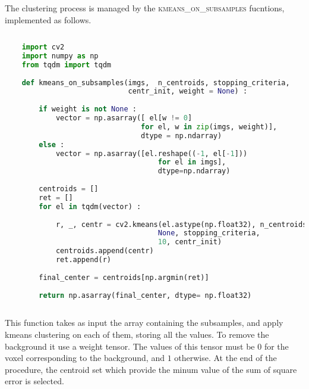 \documentclass{standalone}
\begin{document}
	The clustering process is managed by the \textsc{kmeans\_on\_subsamples} fucntions, implemented as follows. 
	\lstset{style=python}
	\begin{lstlisting}[language=python, caption=kmenas\_on\_subsamples, label=code:kmeans]
		
	import cv2
	import numpy as np
	from tqdm import tqdm
		
	def kmeans_on_subsamples(imgs,  n_centroids, stopping_criteria, 
							 centr_init, weight = None) :
		
		if weight is not None :
			vector = np.asarray([ el[w != 0] 
								for el, w in zip(imgs, weight)], 
								dtype = np.ndarray)
		else :
			vector = np.asarray([el.reshape((-1, el[-1])) 
									for el in imgs], 
									dtype=np.ndarray)
		
		centroids = []
		ret = []
		for el in tqdm(vector) :
		
			r, _, centr = cv2.kmeans(el.astype(np.float32), n_centroids, 
									None, stopping_criteria, 
									10, centr_init)				
			centroids.append(centr)
			ret.append(r)
			
		final_center = centroids[np.argmin(ret)]
		
		return np.asarray(final_center, dtype= np.float32)
		
	\end{lstlisting}


	This function takes as input the array containing the subsamples, and apply kmeans clustering on each of them, storing all the values.
	To remove the background it use a weight tensor. The values of this tensor must be $0$ for the voxel corresponding to the background, and $1$ otherwise. 
	At the end of the procedure, the centroid set which provide the minum value of the sum of square error is selected.



	
	
	
\end{document}
